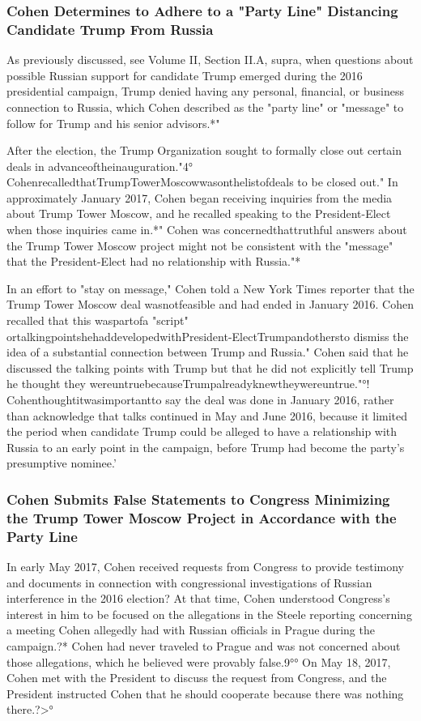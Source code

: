 \subsubsection{Cohen Determines to Adhere to a "Party Line" Distancing Candidate Trump From Russia}

As previously discussed, see Volume II, Section II.A, supra, when questions about possible Russian support for candidate Trump emerged during the 2016 presidential campaign, Trump denied having any personal, financial, or business connection to Russia, which Cohen described as the "party line" or "message" to follow for Trump and his senior advisors.*"

After the election, the Trump Organization sought to formally close out certain deals in advanceoftheinauguration."4°
CohenrecalledthatTrumpTowerMoscowwasonthelistofdeals to be closed out."
In approximately January 2017, Cohen began receiving inquiries from the media about Trump Tower Moscow, and he recalled speaking to the President-Elect when those inquiries came in.*"
Cohen was concernedthattruthful answers about the Trump Tower Moscow project might not be consistent with the "message" that the President-Elect had no relationship with Russia."*

In an effort to "stay on message," Cohen told a New York Times reporter that the Trump Tower Moscow deal wasnotfeasible and had ended in January 2016.
Cohen recalled that this waspartofa "script" ortalkingpointshehaddevelopedwithPresident-ElectTrumpandothersto
dismiss the idea of a substantial connection between Trump and Russia."
Cohen said that he discussed the talking points with Trump but that he did not explicitly tell Trump he thought they wereuntruebecauseTrumpalreadyknewtheywereuntrue."°!
Cohenthoughtitwasimportantto say the deal was done in January 2016, rather than acknowledge that talks continued in May and June 2016, because it limited the period when candidate Trump could be alleged to have a relationship with Russia to an early point in the campaign, before Trump had become the party's presumptive nominee.'

\subsubsection{Cohen Submits False Statements to Congress Minimizing the Trump Tower Moscow Project in Accordance with the Party Line}

In early May 2017, Cohen received requests from Congress to provide testimony and documents in connection with congressional investigations of Russian interference in the 2016 election?
At that time, Cohen understood Congress's interest in him to be focused on the allegations in the Steele reporting concerning a meeting Cohen allegedly had with Russian officials in Prague during the campaign.?*
Cohen had never traveled to Prague and was not concerned about those allegations, which he believed were provably false.9°°
On May 18, 2017, Cohen met with the President to discuss the request from Congress, and the President instructed Cohen that he should cooperate because there was nothing there.?>°

